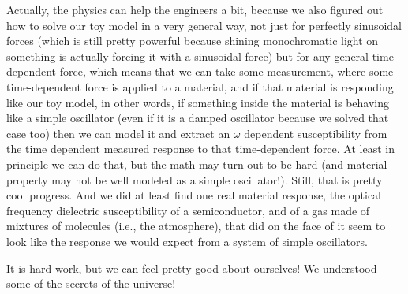 \documentclass[]{revtex4}
\begin{document}
Actually, the physics can help the engineers a bit, because we also figured out how to solve
our toy model in a very general way, not just for perfectly sinusoidal forces (which is
still pretty powerful because shining monochromatic light on something is actually forcing
it with a sinusoidal force) but for any general time-dependent force, which means that we
can take some measurement, where some time-dependent force is applied to a material, and if
that material is responding like our toy model, in other words, if something inside the
material is behaving like a simple oscillator (even if it is a damped oscillator because we
solved that case too) then we can model it and extract an $\omega$ dependent susceptibility
from the time dependent measured response to that time-dependent force.  At least in
principle we can do that, but the math may turn out to be hard (and material property may
not be well modeled as a simple oscillator!).  Still, that is pretty cool progress.  And we
did at least find one real material response, the optical frequency dielectric
susceptibility of a semiconductor, and of a gas made of mixtures of molecules (i.e., the
atmosphere), that did on the face of it seem to look like the response we would expect from
a system of simple oscillators.

It is hard work, but we can feel pretty good about ourselves!  We understood some of the
secrets of the universe!
\end{document}
